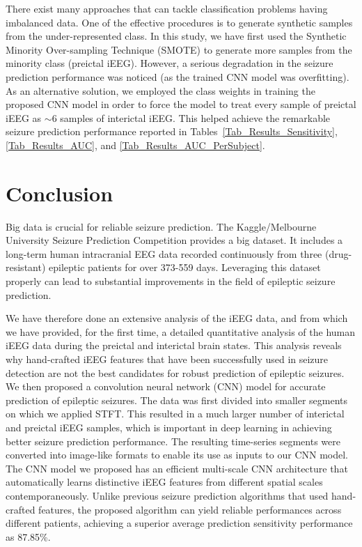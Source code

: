 \documentclass[journal]{IEEEtran}
\begin{document}
There exist many approaches that can tackle classification problems having imbalanced data. One of the effective procedures is to generate synthetic samples from the under-represented class. In this study, we have first used the Synthetic Minority Over-sampling Technique (SMOTE) \cite{chawla2002smote} to generate more samples from the minority class (preictal iEEG). However, a serious degradation in the seizure prediction performance was noticed (as the trained CNN model was overfitting). As an alternative solution, we employed the class weights in training the proposed CNN model in order to force the model to treat every sample of preictal iEEG as $\sim$6 samples of interictal iEEG. This helped achieve the remarkable seizure prediction performance reported in Tables~\ref{Tab_Results_Sensitivity}, \ref{Tab_Results_AUC}, and \ref{Tab_Results_AUC_PerSubject}.   











\section{Conclusion}
\label{Section5}

Big data is crucial for reliable seizure prediction. The Kaggle/Melbourne University Seizure Prediction Competition provides a big dataset. It includes a long-term human intracranial EEG data recorded continuously from three (drug-resistant) epileptic patients for over 373-559 days. Leveraging this dataset properly can lead to substantial improvements in the field of epileptic seizure prediction. 



We have therefore done an extensive analysis of the iEEG data, and from which we have provided,
for the first time, a detailed quantitative analysis of the human iEEG data during the preictal and interictal brain states. This analysis reveals why hand-crafted iEEG features that have been successfully used in seizure detection are not the best candidates for robust prediction of epileptic seizures. We then proposed a convolution neural network (CNN) model for accurate prediction of epileptic seizures. The data was first divided into smaller segments on which we applied STFT. This resulted in a much larger number of interictal and preictal iEEG samples, which is important in deep learning in achieving better seizure prediction performance. 
The resulting time-series segments were converted into image-like formats to enable its use as inputs to our CNN model. The CNN model we proposed has an efficient multi-scale CNN architecture that automatically learns distinctive iEEG features from different spatial scales contemporaneously.
Unlike previous seizure prediction algorithms that used hand-crafted features, the proposed algorithm can yield reliable performances across different patients, achieving a superior average prediction sensitivity performance as 87.85\%.
\end{document}
